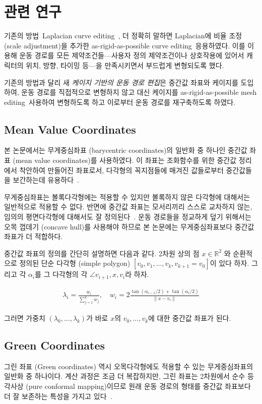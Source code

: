 \documentclass[12pt,a4paper,oneside,final]{report}
\newcommand{\Kim}{\cite{Kim:2009:SMM:1531326.1531385}}
\newcommand{\Igarashi}{\cite{Igarashi:2005:ASM:1073204.1073323}}
\newcommand{\Floater}{\cite{Floater200319}}
\newcommand{\Hormann}{\cite{Hormann:2006:MVC:1183287.1183295}}
\newcommand{\Lipman}{\cite{Lipman:2008:GC:1360612.1360677}}
\newcommand{\Sorkine}{\cite{Sorkine:2004:LSE:1057432.1057456}}
\providecommand{\norm}[1]{\lVert#1\rVert}
\begin{document}
\chapter{관련 연구}
기존의 방법~ Laplacian curve editing~\Sorkine, 더 정확히 말하면
Laplacian에 비율 조정 (scale adjustment)을 추가한 as-rigid-as-possible curve
editing~ 응용하였다. 이를 이용해 운동 경로를 모든
제약조건들---사용자 정의 제약조건이나 상호작용에 있어서 캐릭터의 위치, 방향,
타이밍 등---을 만족시키면서 부드럽게 변형되도록 했다.

기존의 방법과 달리 새 \emph{케이지 기반의 운동 경로 편집}은 중간값 좌표와
케이지를 도입하여, 운동 경로를 직접적으로 변형하지 않고 대신 케이지를
as-rigid-as-possible mesh editing~ 사용하여 변형하도록 하고 이로부터
운동 경로를 재구축하도록 하였다.

\section{Mean Value Coordinates} 본 논문에서는 무게중심좌표
(barycentric coordinates)의 일반화 중 하나인 중간값 좌표 (mean value
coordinates)를 사용하였다. 이 좌표는 조화함수를 위한 중간값 정리에서 착안하여
만들어진 좌표로서, 다각형의 꼭지점들에 매겨진 값들로부터 중간값들을 보간하는데
유용하다~\Floater.

무게중심좌표는 볼록다각형에는 적용할 수 있지만 볼록하지 않은 다각형에 대해서는
일반적으로 적용할 수 없다. 반면에 중간값 좌표는 모서리끼리 스스로 교차하지
않는, 임의의 평면다각형에 대해서도 잘 정의된다~\Hormann. 운동 경로들을 정교하게
덮기 위해서는 오목 껍데기 (concave hull)를 사용해야 하므로 본 논문에는
무게중심좌표보다 중간값 좌표가 더 적합하다.

중간값 좌표의 정의를 간단히 설명하면 다음과 같다. 2차원 상의 점 $x \in
\mathbb{R}^2$ 와 순환적으로 정의된 단순 다각형 (simple polygon) $[v_0, v_1,
..., v_k, v_{k+1} = v_0]$이 있다 하자. 그리고 각 $\alpha_i$를 그 다각형의 각
$\angle v_{i+1},x,v_{i}$라 하자.

\begin{align}
\lambda_i = \frac{w_i}{\sum_{j=1}^{k}w_j}, \quad w_i =
2\frac{\tan(\alpha_{i-1}/2) + \tan(\alpha_{i}/2)}{\norm{x - v_i}}
\end{align}

그러면 가중치 $(\lambda_0, ..., \lambda_k)$가 바로 $x$의 $v_0, ...  , v_k$에
대한 중간값 좌표가 된다.

\section{Green Coordinates}
그린 좌표 (Green coordinates) 역시 오목다각형에도 적용할 수 있는
무게중심좌표의 일반화 중 하나이다. 계산 과정은 조금 더 복잡하지만, 그린 좌표는
2차원에서 순수 등각사상 (pure conformal mapping)이므로 원래 운동 경로의 형태를
중간값 좌표보다 더 잘 보존하는 특성을 가지고 있다~\Lipman.
\end{document}
